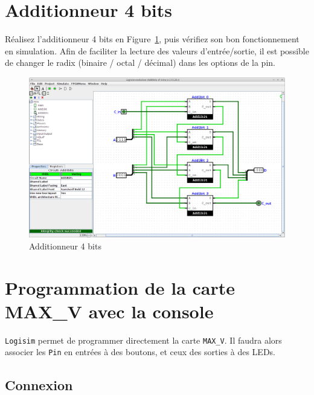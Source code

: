 \documentclass[nosolution]{exercice}
\begin{document}
\section{Additionneur 4 bits}

Réalisez l'additionneur 4 bits en Figure~\ref{fig_add4bits}, puis vérifiez son bon fonctionnement en simulation.
Afin de faciliter la lecture des valeurs d'entrée/sortie, il est possible de changer le radix (binaire / octal / décimal) dans les options de la pin.
\begin{figure}[H]
\begin{center}
\includegraphics[width=385pt]{images/logisim_add4bits.png}
\caption{\label{fig_add4bits}Additionneur 4 bits}
\end{center}
\end{figure}


\newpage
\section{Programmation de la carte MAX\_V avec la console}

\texttt{Logisim} permet de programmer directement la carte \texttt{MAX\_V}. Il faudra alors associer les
\texttt{Pin} en entrées à des boutons, et ceux des sorties à des LEDs.


\subsection{Connexion}
\end{document}
